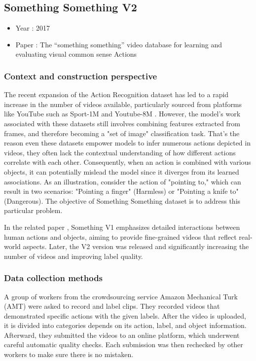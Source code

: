 \documentclass[10pt,onecolumn,letterpaper]{article}
\begin{document}
\subsection{Something Something V2}

\begin{itemize}
	\item Year : 2017
	\item Paper : The “something something” video database for learning and evaluating visual common sense
	Actions \cite{somethingsomething}
\end{itemize}

\subsubsection{\textbf{Context and construction perspective}}

The recent expansion of the Action Recognition dataset has led to a rapid increase in the number of videos available, particularly sourced from platforms like YouTube such as Sport-1M \cite{Sports1M} and Youtube-8M \cite{YouTube8M}. However, the model's work associated with these datasets still involves combining features extracted from frames, and therefore becoming a "set of image" classification task. That's the reason even these datasets empower models to infer numerous actions depicted in videos, they often lack the contextual understanding of how different actions correlate with each other. Consequently, when an action is combined with various objects, it can potentially mislead the model since it diverges from its learned associations. As an illustration, consider the action of "pointing to," which can result in two scenarios: "Pointing a finger" (Harmless) or "Pointing a knife to" (Dangerous). The objective of Something Something dataset is to address this particular problem.

In the related paper \cite{somethingsomething}, Something V1 emphasizes detailed interactions between human actions and objects, aiming to provide fine-grained videos that reflect real-world aspects. Later, the V2 version was released and significantly increasing the number of videos and improving label quality.
\subsubsection{Data collection methods}
A group of workers from the crowdsourcing service Amazon Mechanical Turk (AMT) were asked to record and label clips. They recorded videos that demonstrated specific actions with the given labels. After the video is uploaded, it is divided into categories depends on its action, label, and object information. Afterward, they submitted the videos to an online platform, which underwent careful automatic quality checks. Each submission was then rechecked by other workers to make sure there is no mistaken.
\end{document}
